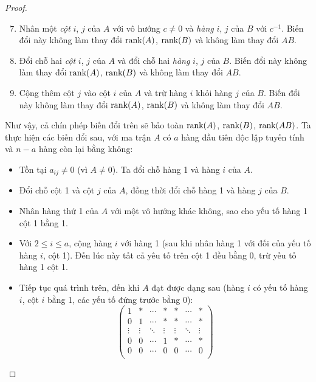 \documentclass[class=linearalgebra,crop=false]{standalone}
\begin{document}
\begin{proof}
\begin{enumerate}[label = (\roman*)]
        \setcounter{enumi}{6}
        \item Nhân một \textit{cột} $i$, $j$ của $A$ với vô hướng $c\ne 0$ và \textit{hàng} $i$, $j$ của $B$ với $c^{-1}$. Biến đổi này không làm thay đổi $\text{rank}(A)$, $\text{rank}(B)$ và không làm thay đổi $AB$.
        \item Đổi chỗ hai \textit{cột} $i$, $j$ của $A$ và đổi chỗ hai \textit{hàng} $i$, $j$ của $B$. Biến đổi này không làm thay đổi $\text{rank}(A)$, $\text{rank}(B)$ và không làm thay đổi $AB$.
        \item Cộng thêm cột $j$ vào cột $i$ của $A$ và trừ hàng $i$ khỏi hàng $j$ của $B$. Biến đổi này không làm thay đổi $\text{rank}(A)$, $\text{rank}(B)$ và không làm thay đổi $AB$.
    \end{enumerate}
    \par Như vậy, cả chín phép biến đổi trên sẽ bảo toàn $\text{rank}(A)$, $\text{rank}(B)$, $\text{rank}(AB)$. Ta thực hiện các biến đổi sau, với ma trận $A$ có $a$ hàng đầu tiên độc lập tuyến tính và $n - a$ hàng còn lại bằng không:
    \begin{itemize}
        \item Tồn tại $a_{ij}\ne 0$ (vì $A\ne 0$). Ta đổi chỗ hàng 1 và hàng $i$ của $A$.
        \item Đổi chỗ cột 1 và cột $j$ của $A$, đồng thời đổi chỗ hàng 1 và hàng $j$ của $B$.
        \item Nhân hàng thứ 1 của $A$ với một vô hướng khác không, sao cho yếu tố hàng 1 cột 1 bằng 1.
        \item Với $2\le i\le a$, cộng hàng $i$ với hàng 1 (sau khi nhân hàng 1 với đối của yếu tố hàng $i$, cột 1). Đến lúc này tất cả yêu tố trên cột 1 đều bằng 0, trừ yếu tố hàng 1 cột 1.
        \item Tiếp tục quá trình trên, đến khi $A$ đạt được dạng sau (hàng $i$ có yếu tố hàng $i$, cột $i$ bằng 1, các yếu tố đứng trước bằng 0):
              \[
                  \begin{pmatrix}
                      1      & *      & \cdots & *      & *      & \cdots & *      \\
                      0      & 1      & \cdots & *      & *      & \cdots & *      \\
                      \vdots & \vdots & \ddots & \vdots & \vdots & \ddots & \vdots \\
                      0      & 0      & \cdots & 1      & *      & \cdots & *      \\
                      0      & 0      & \cdots & 0      & 0      & \cdots & 0      \\

\end{pmatrix}\]
\end{itemize}
\end{proof}
\end{document}
